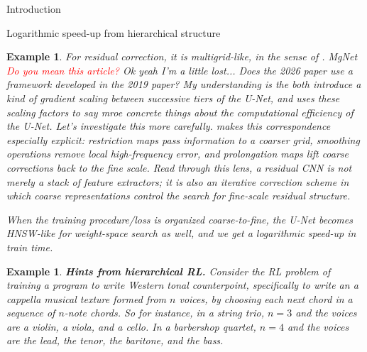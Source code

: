 \documentclass[11pt]{article}
\newtheorem{example}[subsubsection]{Example}
\begin{document}
\begin{section}{Introduction}
\begin{subsection}{Logarithmic speed-up from hierarchical structure}
\begin{example}
For residual correction, it is {\em multigrid}-like, in the sense of \cite{AhamedZakariaeiHaberEliasofMGE2026}. MgNet \textcolor{red}{Do you mean this \cite{he2019mgnet} article?} {\color{blue} Ok yeah I'm a little lost... Does the 2026 paper use a framework developed in the 2019 paper? My understanding is the both introduce a kind of gradient scaling between successive tiers of the U-Net, and uses these scaling factors to say mroe concrete things about the computational efficiency of the U-Net. Let's investigate this more carefully.} makes this correspondence especially explicit: restriction maps pass information to a coarser grid, smoothing operations remove local high-frequency error, and prolongation maps lift coarse corrections back to the fine scale. Read through this lens, a residual CNN is not merely a stack of feature extractors; it is also an iterative correction scheme in which coarse representations control the search for fine-scale residual structure.

When the training procedure/loss is organized coarse-to-fine, the U-Net becomes HNSW-like for weight-space search as well, and we get a logarithmic speed-up in train time.
\end{example}

\begin{example}
{\bf Hints from hierarchical RL.}
\normalfont
Consider the RL problem of training a program to write Western tonal counterpoint, specifically to write an {\em a cappella} musical texture formed from $n$ voices, by choosing each next chord in a sequence of $n$-note chords. So for instance, in a string trio, $n=3$ and the voices are a violin, a viola, and a cello. In a barbershop quartet, $n=4$ and the voices are the lead, the tenor,  the baritone, and the bass.


\end{example}
\end{subsection}
\end{section}
\end{document}
